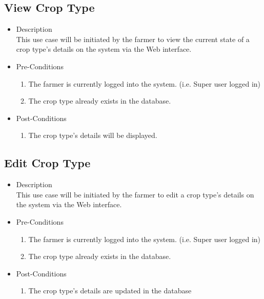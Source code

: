 \documentclass[11pt,fleqn]{book} %
\begin{document}
		\subsection{View Crop Type}
		\begin{itemize}
			\item Description\\
			This use case will be initiated by the farmer to view the current state of a crop type’s details on the system via the Web interface.
			\item Pre-Conditions
			\begin{enumerate}
				\item The farmer is currently logged into the system. (i.e. Super user logged in)
				\item The crop type already exists in the database.			
			\end{enumerate}
			\item Post-Conditions
			\begin{enumerate}
				\item The crop type’s details will be displayed.
			\end{enumerate}
		\end{itemize}
		
		\subsection{Edit Crop Type}
		\begin{itemize}
			\item Description\\
			This use case will be initiated by the farmer to edit a crop type’s details on the system via the Web interface.
			\item Pre-Conditions
			\begin{enumerate}
				\item The farmer is currently logged into the system. (i.e. Super user logged in)
				\item The crop type already exists in the database.					
			\end{enumerate}
			\item Post-Conditions
			\begin{enumerate}
				\item The crop type’s details are updated in the database
			\end{enumerate}
		\end{itemize}
		
\end{document}
